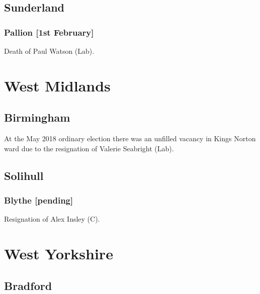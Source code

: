 \documentclass[a4paper,openany]{book}
\begin{document}
\begin{resultsiii}
\subsection*{Sunderland}

\subsubsection*{Pallion \hspace*{\fill}\nolinebreak[1]%
\enspace\hspace*{\fill}
[1st February]}


Death of Paul Watson (Lab).

\section{West Midlands}

\subsection*{Birmingham}

At the May 2018 ordinary election there was an unfilled vacancy in Kings Norton ward due to the resignation of Valerie Seabright (Lab).

\subsection*{Solihull}

\subsubsection*{Blythe \hspace*{\fill}\nolinebreak[1]%
\enspace\hspace*{\fill}
[pending]}


Resignation of Alex Insley (C).

\section{West Yorkshire}

\subsection*{Bradford}


\end{resultsiii}
\end{document}
